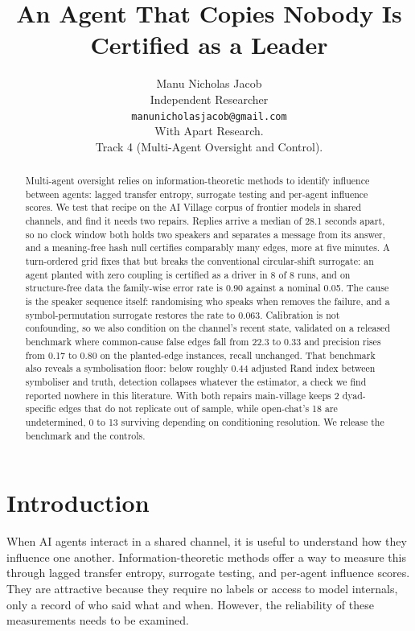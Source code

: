 \documentclass[11pt]{article}
\title{\textbf{An Agent That Copies Nobody Is Certified as a Leader}}
\author{Manu Nicholas Jacob \\ Independent Researcher \\ \texttt{manunicholasjacob@gmail.com} \\[0.6em] With Apart Research. \\ Track 4 (Multi-Agent Oversight and Control).}
\date{}
\begin{document}
\maketitle
\begin{abstract}
Multi-agent oversight relies on information-theoretic methods to identify influence between agents: lagged transfer entropy, surrogate testing and per-agent influence scores. We test that recipe on the AI Village corpus of frontier models in shared channels, and find it needs two repairs. Replies arrive a median of 28.1 seconds apart, so no clock window both holds two speakers and separates a message from its answer, and a meaning-free hash null certifies comparably many edges, more at five minutes. A turn-ordered grid fixes that but breaks the conventional circular-shift surrogate: an agent planted with zero coupling is certified as a driver in 8 of 8 runs, and on structure-free data the family-wise error rate is 0.90 against a nominal 0.05. The cause is the speaker sequence itself: randomising who speaks when removes the failure, and a symbol-permutation surrogate restores the rate to 0.063. Calibration is not confounding, so we also condition on the channel's recent state, validated on a released benchmark where common-cause false edges fall from 22.3 to 0.33 and precision rises from 0.17 to 0.80 on the planted-edge instances, recall unchanged. That benchmark also reveals a symbolisation floor: below roughly 0.44 adjusted Rand index between symboliser and truth, detection collapses whatever the estimator, a check we find reported nowhere in this literature. With both repairs main-village keeps 2 dyad-specific edges that do not replicate out of sample, while open-chat's 18 are undetermined, 0 to 13 surviving depending on conditioning resolution. We release the benchmark and the controls.
\end{abstract}

\section{Introduction}

When AI agents interact in a shared channel, it is useful to understand how they influence one another. Information-theoretic methods offer a way to measure this through lagged transfer entropy, surrogate testing, and per-agent influence scores. They are attractive because they require no labels or access to model internals, only a record of who said what and when. However, the reliability of these measurements needs to be examined.
\end{document}
